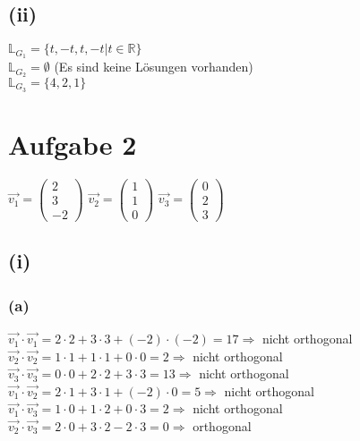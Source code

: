 \documentclass{article}
\begin{document}
\subsection{(ii)}
$\mathbb{L}_{G_1} = \{t, -t, t, -t | t \in \mathbb{R}\}$ \\
$\mathbb{L}_{G_2} = \emptyset$ (Es sind keine Lösungen vorhanden) \\
$\mathbb{L}_{G_3} = \{4, 2, 1\}$
\section{Aufgabe 2}
 \begin{center}
    $\vec{v_1} = \left(\begin{array}{c} 2\\ 3 \\-2 \end{array}\right)$
    $\vec{v_2} = \left(\begin{array}{c} 1\\ 1 \\0 \end{array}\right)$
    $\vec{v_3} = \left(\begin{array}{c} 0\\ 2 \\3 \end{array}\right)$
 \end{center}
\subsection{(i)} 
\subsubsection{(a)}
    $\vec{v_1} \cdot \vec{v_1} = 2\cdot2+3\cdot3+(-2)\cdot(-2) =17\Longrightarrow$ nicht orthogonal  \\
    $\vec{v_2} \cdot \vec{v_2} = 1\cdot1+1\cdot1+0\cdot0= 2 \Longrightarrow$ nicht orthogonal\\
    $\vec{v_3} \cdot \vec{v_3} = 0\cdot0+2\cdot2+3\cdot3=13\Longrightarrow$ nicht orthogonal \\
    $\vec{v_1} \cdot \vec{v_2}= 2 \cdot 1 + 3 \cdot 1 + (-2) \cdot 0 = 5 \Longrightarrow$ nicht orthogonal \\
    $\vec{v_1} \cdot \vec{v_3}=1\cdot0+1\cdot2+0\cdot3=2\Longrightarrow$  nicht orthogonal \\
    $\vec{v_2} \cdot \vec{v_3}=2\cdot0+3\cdot2-2\cdot3 = 0\Longrightarrow$ orthogonal \\
\end{document}
